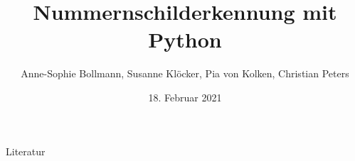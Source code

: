 \documentclass[10pt]{beamer}
\title{Nummernschilderkennung mit Python}
\date{18. Februar 2021}
\author{Anne-Sophie Bollmann, Susanne Kl\"ocker, Pia von Kolken, Christian Peters}
\begin{document}
\maketitle











\appendix

\begin{frame}[allowframebreaks]{Literatur}
  \nocite{*}
  
  

\end{frame}
\end{document}
